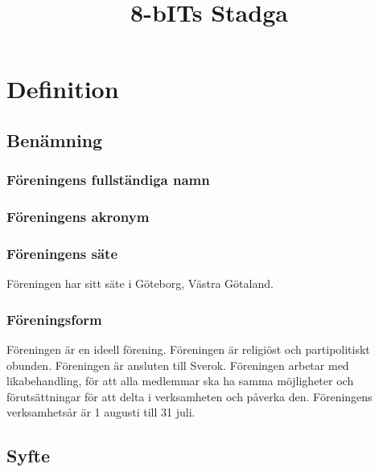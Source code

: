 \documentclass[11pt, noincludeaddress]{classes/cthit}
\begin{document}
\title{8-bITs Stadga}
\maketitle

\thispagestyle{empty}

\newpage

\makeheadfoot%

\setcounter{tocdepth}{2}
\setcounter{page}{1}
\tableofcontents

\newpage

\section{Definition}

\subsection{Benämning}

\subsubsection{Föreningens fullständiga namn}
\EIGHTBITFULL{}

\subsubsection{Föreningens akronym}
\EIGHTBIT{}

\subsubsection{Föreningens säte}
Föreningen har sitt säte i Göteborg, Västra Götaland.

\subsubsection{Föreningsform}
Föreningen är en ideell förening. Föreningen är religiöst och partipolitiskt obunden. Föreningen är ansluten till Sverok. Föreningen arbetar med likabehandling, för att alla medlemmar ska ha samma möjligheter och förutsättningar för att delta i verksamheten och påverka den. Föreningens verksamhetsår är 1 augusti till 31 juli.

\subsection{Syfte}
\end{document}
